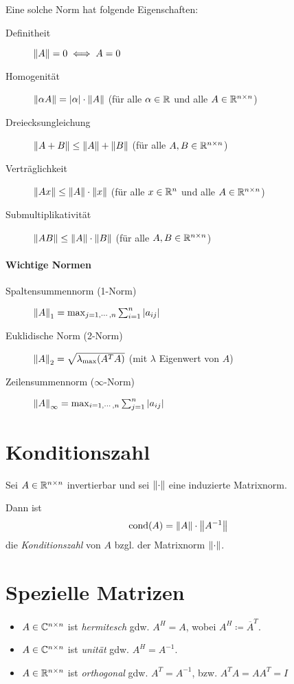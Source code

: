         Eine solche Norm hat folgende Eigenschaften:
        \begin{description}
        	\item[Definitheit] \( \norm{A} = 0 \iff A = 0 \)
        	\item[Homogenität] \( \norm{\alpha A} = \abs{\alpha} \cdot \norm{A} \) (für alle \( \alpha \in \mathbb{R} \) und alle \( A \in \mathbb{R}^{n \times n} \))
        	\item[Dreiecksungleichung] \( \norm{A + B} \leq \norm{A} + \norm{B} \) (für alle \( A, B \in \mathbb{R}^{n \times n} \))
        	\item[Verträglichkeit] \( \norm{Ax} \leq \norm{A} \cdot \norm{x} \) (für alle \( x \in \mathbb{R}^n \) und alle \( A \in \mathbb{R}^{n \times n} \))
        	\item[Submultiplikativität] \( \norm{AB} \leq \norm{A} \cdot \norm{B} \) (für alle \( A, B \in \mathbb{R}^{n \times n} \))
        \end{description}
    
	    \paragraph{Wichtige Normen}
		    \begin{description}
		    	\item[Spaltensummennorm (1-Norm)] \( \norm{A}_1 = \max_{j = 1, \cdots, n} \sum_{i = 1}^n \abs{a_{ij}} \)
		    	\item[Euklidische Norm (2-Norm)] \( \norm{A}_2 = \sqrt{\lambda _ \textrm{max} (A^T A)} \) (mit \(\lambda\) Eigenwert von \( A \))
		    	\item[Zeilensummennorm (\(\infty\)-Norm)] \( \norm{A}_\infty = \max_{i = 1, \cdots, n} \sum_{j = 1}^n \abs{a_{ij}} \)
		    \end{description}

    \section{Konditionszahl}
        Sei \( A \in \mathbb{R}^{n \times n} \) invertierbar und sei \( \norm{\cdot} \) eine induzierte Matrixnorm.
        
        Dann ist \[ \operatorname{cond}(A) = \norm{A} \cdot \norm{A^{-1}} \] die \textit{Konditionszahl} von \(A\) bzgl. der Matrixnorm \( \norm{\cdot} \).

    \section{Spezielle Matrizen}
	    \begin{itemize}
	        \item \(A \in \mathbb{C}^{n \times n}\) ist \textit{hermitesch} gdw. \( A^H = A \), wobei \( A^H \coloneqq \overline{A}^T \).
	        \item \(A \in \mathbb{C}^{n \times n}\) ist \textit{unität} gdw. \( A^H = A^{-1} \).
	        \item \(A \in \mathbb{R}^{n \times n}\) ist \textit{orthogonal} gdw. \( A^T = A^{-1} \), bzw. \( A^TA = AA^T = I \)
	    \end{itemize}

